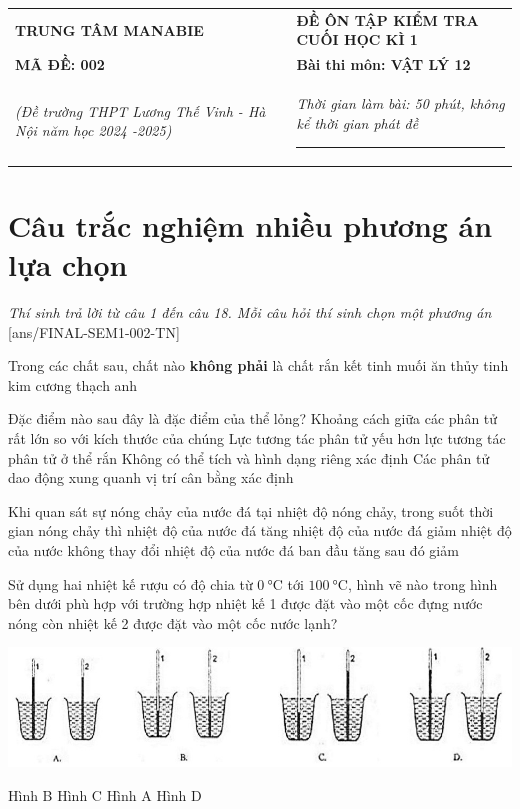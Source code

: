\begin{tabular}{M{6.5cm}M{11cm}}
	\textbf{TRUNG TÂM MANABIE}& \textbf{ĐỀ ÔN TẬP KIỂM TRA CUỐI HỌC KÌ 1}\\
	\textbf{MÃ ĐỀ: 002}& \textbf{Bài thi môn: VẬT LÝ 12}\\
	\textit{(Đề trường THPT Lương Thế Vinh - Hà Nội năm học 2024 -2025)}& \textit{Thời gian làm bài: 50 phút, không kể thời gian phát đề}
	
	\noindent\rule{4cm}{0.8pt} \\
\end{tabular}
\setcounter{section}{0}
\section{Câu trắc nghiệm nhiều phương án lựa chọn}
\textit{Thí sinh trả lời từ câu 1 đến câu 18. Mỗi câu hỏi thí sinh chọn một phương án}
\setcounter{ex}{0}
[ans/FINAL-SEM1-002-TN]
\begin{ex}
	Trong các chất sau, chất nào \textbf{không phải} là chất rắn kết tinh
	\choice
	{muối ăn}
	{\True thủy tinh}
	{kim cương}
	{thạch anh}
	\loigiai{}
\end{ex}
\begin{ex}
	Đặc điểm nào sau đây là đặc điểm của thể lỏng?
	\choice
	{Khoảng cách giữa các phân tử rất lớn so với kích thước của chúng}
	{\True Lực tương tác phân tử yếu hơn lực tương tác phân tử ở thể rắn}
	{Không có thể tích và hình dạng riêng xác định}
	{Các phân tử dao động xung quanh vị trí cân bằng xác định}
	\loigiai{}
\end{ex}
\begin{ex}
	Khi quan sát sự nóng chảy của nước đá tại nhiệt độ nóng chảy, trong suốt thời gian nóng chảy thì
	\choice
	{nhiệt độ của nước đá tăng}
	{nhiệt độ của nước đá giảm}
	{\True nhiệt độ của nước không thay đổi}
	{nhiệt độ của nước đá ban đầu tăng sau đó giảm}
	\loigiai{}
\end{ex}
\begin{ex}
	Sử dụng hai nhiệt kế rượu có độ chia từ $\SI{0}{\celsius}$ tới $\SI{100}{\celsius}$, hình vẽ nào trong hình bên dưới phù hợp với trường hợp nhiệt kế 1 được đặt vào một cốc đựng nước nóng còn nhiệt kế 2 được đặt vào một cốc nước lạnh?
	\begin{center}
		\includegraphics[scale=0.7]{../figs/FINAL-SEM1-002-1}
	\end{center}
	\choice
	{Hình B}
	{Hình C}
	{Hình A}
	{\True Hình D}
	\loigiai{}
\end{ex}
